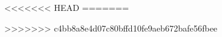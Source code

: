 \renewcommand{\thefigure}{\thechapter-\arabic{figure}}
\renewcommand{\thetable}{\thechapter-\arabic{table}}
\renewcommand{\theequation}{\thechapter-\arabic{equation}}





<<<<<<< HEAD
% 
=======

>>>>>>> c4bb8a8e4d07c80bffd10fe9aeb672bafe56fbee

